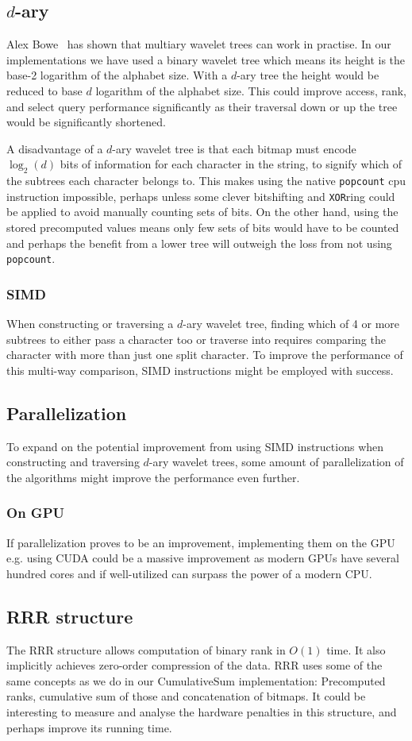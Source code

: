 \subsection{$d$-ary}
Alex Bowe~ has shown that multiary wavelet trees can work in practise.
In our implementations we have used a binary wavelet tree which means its height is the base-2 logarithm of the alphabet size.
With a $d$-ary tree the height would be reduced to base $d$ logarithm of the alphabet size.
This could improve access, rank, and select query performance significantly as their traversal down or up the tree would be significantly shortened.

A disadvantage of a $d$-ary wavelet tree is that each bitmap must encode $\log_2(d)$ bits of information for each character in the string, to signify which of the subtrees each character belongs to.
This makes using the native \texttt{popcount} cpu instruction impossible, perhaps unless some clever bitshifting and \texttt{XOR}ring could be applied to avoid manually counting sets of bits.
On the other hand, using the stored precomputed values means only few sets of bits would have to be counted and perhaps the benefit from a lower tree will outweigh the loss from not using \texttt{popcount}.

\subsubsection{SIMD}
When constructing or traversing a $d$-ary wavelet tree, finding which of 4 or more subtrees to either pass a character too or traverse into requires comparing the character with more than just one split character.
To improve the performance of this multi-way comparison, SIMD instructions might be employed with success.


\subsection{Parallelization}
To expand on the potential improvement from using SIMD instructions when constructing and traversing $d$-ary wavelet trees, some amount of parallelization of the algorithms might improve the performance even further.
\subsubsection{On GPU}
If parallelization proves to be an improvement, implementing them on the GPU e.g. using CUDA could be a massive improvement as modern GPUs have several hundred cores and if well-utilized can surpass the power of a modern CPU.

\subsection{RRR structure}
The RRR structure allows computation of binary rank in $O(1)$ time. 
It also implicitly achieves zero-order compression of the data.
RRR uses some of the same concepts as we do in our CumulativeSum implementation: Precomputed ranks, cumulative sum of those and concatenation of bitmaps.
It could be interesting to measure and analyse the hardware penalties in this structure, and perhaps improve its running time.

